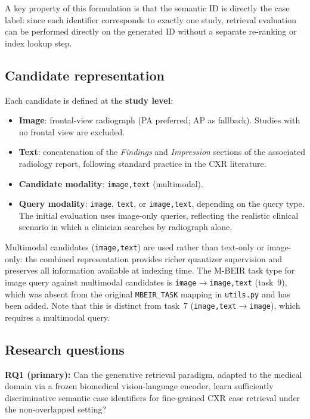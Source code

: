 \documentclass[11pt,a4paper]{article}
\begin{document}
A key property of this formulation is that the semantic ID is directly the case
label: since each identifier corresponds to exactly one study, retrieval
evaluation can be performed directly on the generated ID without a separate
re-ranking or index lookup step.

\subsection{Candidate representation}

Each candidate is defined at the \textbf{study level}:
\begin{itemize}[itemsep=2pt]
    \item \textbf{Image}: frontal-view radiograph (PA preferred; AP as fallback).
    Studies with no frontal view are excluded.
    \item \textbf{Text}: concatenation of the \textit{Findings} and
    \textit{Impression} sections of the associated radiology report,
    following standard practice in the CXR literature.
    \item \textbf{Candidate modality}: \texttt{image,text} (multimodal).
    \item \textbf{Query modality}: \texttt{image}, \texttt{text}, or
    \texttt{image,text}, depending on the query type.
    The initial evaluation uses image-only queries, reflecting the realistic
    clinical scenario in which a clinician searches by radiograph alone.
\end{itemize}

Multimodal candidates (\texttt{image,text}) are used rather than text-only or
image-only: the combined representation provides richer quantizer supervision
and preserves all information available at indexing time.
The M-BEIR task type for image query against multimodal candidates is
\texttt{image$\to$image,text} (task~9), which was absent from the original
\texttt{MBEIR\_TASK} mapping in \texttt{utils.py} and has been added.
Note that this is distinct from task~7 (\texttt{image,text$\to$image}), which
requires a multimodal query.

\subsection{Research questions}

\textbf{RQ1 (primary):}
Can the generative retrieval paradigm, adapted to the medical domain via a
frozen biomedical vision-language encoder, learn sufficiently discriminative
semantic case identifiers for fine-grained CXR case retrieval under the
non-overlapped setting?
\end{document}
